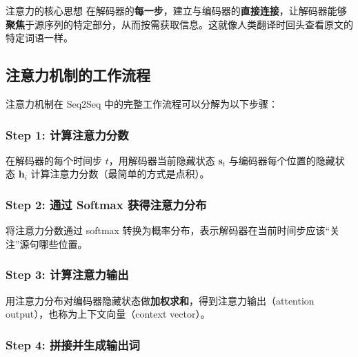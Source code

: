 \documentclass[a4paper]{article}
\begin{document}
\begin{importantbox}{注意力的核心思想}
在解码器的\textbf{每一步}，建立与编码器的\textbf{直接连接}，让解码器能够\textbf{聚焦}于源序列的特定部分，从而按需获取信息。这就像人类翻译时回头查看原文的特定词语一样。
\end{importantbox}





\subsection{注意力机制的工作流程}

注意力机制在 Seq2Seq 中的完整工作流程可以分解为以下步骤：

\subsubsection{Step 1: 计算注意力分数}

在解码器的每个时间步 $t$，用解码器当前隐藏状态 $\mathbf{s}_t$ 与编码器每个位置的隐藏状态 $\mathbf{h}_i$ 计算注意力分数（最简单的方式是点积）。









\subsubsection{Step 2: 通过 Softmax 获得注意力分布}

将注意力分数通过 softmax 转换为概率分布，表示解码器在当前时间步应该``关注''源句哪些位置。





\subsubsection{Step 3: 计算注意力输出}

用注意力分布对编码器隐藏状态做\textbf{加权求和}，得到注意力输出（attention output），也称为上下文向量（context vector）。





\subsubsection{Step 4: 拼接并生成输出词}
\end{document}
